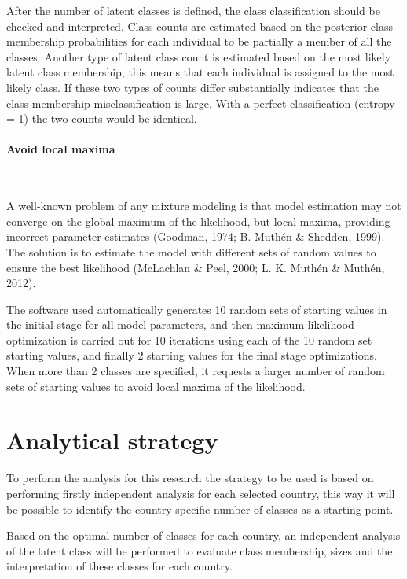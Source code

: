 \documentclass[12pt,a4paper,oneside]{reedthesis}
\begin{document}
After the number of latent classes is defined, the class classification should be checked and interpreted. Class counts are estimated based on the posterior class membership probabilities for each individual to be partially a member of all the classes. Another type of latent class count is estimated based on the most likely latent class membership, this means that each individual is assigned to the most likely class. If these two types of counts differ substantially indicates that the class membership misclassification is large. With a perfect classification (entropy = 1) the two counts would be identical.

\hypertarget{avoid-local-maxima}{%
\paragraph{Avoid local maxima}\label{avoid-local-maxima}}

~

A well-known problem of any mixture modeling is that model estimation may not converge on the global maximum of the likelihood, but local maxima, providing incorrect parameter estimates (Goodman, 1974; B. Muthén \& Shedden, 1999). The solution is to estimate the model with different sets of random values to ensure the best likelihood (McLachlan \& Peel, 2000; L. K. Muthén \& Muthén, 2012).

The software used automatically generates 10 random sets of starting values in the initial stage for all model parameters, and then maximum likelihood optimization is carried out for 10 iterations using each of the 10 random set starting values, and finally 2 starting values for the final stage optimizations. When more than 2 classes are specified, it requests a larger number of random sets of starting values to avoid local maxima of the likelihood.

\hypertarget{analytical-strategy}{%
\section{Analytical strategy}\label{analytical-strategy}}

To perform the analysis for this research the strategy to be used is based on performing firstly independent analysis for each selected country, this way it will be possible to identify the country-specific number of classes as a starting point.

Based on the optimal number of classes for each country, an independent analysis of the latent class will be performed to evaluate class membership, sizes and the interpretation of these classes for each country.
\end{document}

